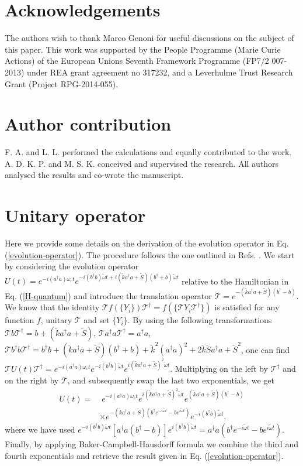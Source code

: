 \documentclass[aps,twocolumn,preprintnumbers,amsmath,amssymb]{revtex4}
\newcommand{\ad}{a^{\dag}}
\newcommand{\bd}{b^{\dag}}
\begin{document}
\section{Acknowledgements}
The authors wish to thank Marco Genoni for useful discussions on the subject of this paper.
This work was supported by the People Programme (Marie Curie Actions) of the European Unions Seventh Framework Programme (FP7/2 007-2013) under REA grant
agreement no 317232, and a Leverhulme Trust Research Grant (Project RPG-2014-055). 
\section*{Author contribution}

F. A. and L. L. performed the calculations and equally contributed to the work. A. D. K. P. and M. S. K. conceived and supervised the research. All authors analysed the results and co-wrote the manuscript.

\appendix
\noindent
\section{\label{Unitary operator} Unitary operator}
Here we provide some details on the derivation of the evolution operator in Eq. (\ref{evolution-operator}). The procedure follows the one outlined in Refs. \cite{mancini1997, bose1997}. We start by considering the evolution operator $U(t)=e^{-i(\ad a)\omega_ct}e^{-i(\bd b)\tilde{\omega}t+i(\tilde{k}\ad a+\tilde{S})(\bd+b)\tilde{\omega}t}$ relative to the Hamiltonian in Eq. (\ref{H-quantum}) and introduce the translation operator $\mathcal{T}=e^{-(\tilde{k}\ad a+\tilde{S})(\bd-b)}$. We know that the identity $\mathcal{T}f(\{Y_i\})\mathcal{T}^{\dag}=f(\{\mathcal{T}Y_i\mathcal{T}^{\dag}\})$ is satisfied for any function $f$, unitary $\mathcal{T}$ and set $\{Y_i\}$. By using the following transformations $\mathcal{T}b\mathcal{T}^{\dag}=b+(\tilde{k}\ad a+\tilde{S})$, $\mathcal{T}\ad a\mathcal{T}^{\dag}=\ad a$, $\mathcal{T}\bd b\mathcal{T}^{\dag}=\bd b+(\tilde{k}\ad a+\tilde{S})(\bd+b)+\tilde{k}^2(\ad a)^2+2\tilde{k}\tilde{S}\ad a+\tilde{S}^2$,
one can find $\mathcal{T}U(t)\mathcal{T}^{\dag}=e^{-i(\ad a)\omega_c t}e^{-i(\bd b)\tilde{\omega}t}e^{i(\tilde{k}\ad a+\tilde{S})^2\tilde{\omega}t}$. Multiplying on the left by $\mathcal{T}^{\dag}$ and on the right by $\mathcal{T}$,
and subsequently swap the last two exponentials, we get
\begin{equation}\begin{split}
U(t)=&\;e^{-i(\ad a)\omega_ct}e^{i(\tilde{k}\ad a+\tilde{S})^2\tilde{\omega}t}e^{(\tilde{k}\ad a+\tilde{S})(\bd-b)}\\
&\times e^{-(\tilde{k}\ad a+\tilde{S})(\bd e^{-i\tilde{\omega}t}-be^{i\tilde{\omega}t})}e^{-i(\bd b)\tilde{\omega}t},
\end{split}\end{equation}
where we have used $e^{-i(\bd b)\tilde{\omega}t}[\ad a(\bd-b)]e^{i(\bd b)\tilde{\omega}t}=\ad a(\bd e^{-i\tilde{\omega}t}-be^{i\tilde{\omega}t})$. Finally, by applying Baker-Campbell-Hausdorff formula we combine the third and fourth exponentials and retrieve the result given in Eq. (\ref{evolution-operator}).\\
\end{document}
